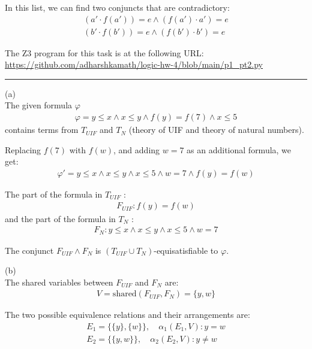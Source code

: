 \documentclass[12pt,letterpaper, onecolumn]{exam}
\newcommand{\link}[1]{{\color{blue}\href{#1}{#1}}}
\begin{document}
\begin{questions}
	In this list, we can find two conjuncts that are contradictory:
	\begin{align*}
		(a' \cdot f(a')) = e \land (f(a') \cdot a') = e \\
		(b' \cdot f(b')) = e \land (f(b') \cdot b') = e
	\end{align*}

	The Z3 program for this task is at the following URL:
	\link{https://github.com/adharshkamath/logic-hw-4/blob/main/p1\_pt2.py}


    {\rule{17cm}{0.4pt}}

	\question[]
	\solutiontitle

	(a) \\
	The given formula $ \varphi $
	\begin{align*}
		\varphi = y \le x \land x \le y \land f(y) = f(7) \land x \le 5
	\end{align*}
	contains terms from $ T_{UIF} $ and $ T_{N} $ (theory of UIF and theory of natural numbers).

	Replacing $ f(7) $ with $ f(w) $, and adding $ w= 7 $ as an additional formula, we get:
	\begin{align*}
		\varphi' = y \le x \land x \le y \land x \le 5 \land w = 7 \land f(y) = f(w) 
	\end{align*} 

	The part of the formula in $ T_{UIF} $ :
	\begin{align*}
		F_{UIF} : f(y) = f(w)
	\end{align*}
	and the part of the formula in $ T_{N} $ :
	\begin{align*}
		F_{N} : y \le x \land x \le y \land x \le 5 \land w = 7
	\end{align*}

	The conjunct $ F_{UIF} \land F_{N} $ is $(T_{UIF} \cup T_N)$-equisatisfiable to $ \varphi $.

	(b) \\
	The shared variables between $ F_{UIF} $ and $ F_{N} $ are:
	\begin{align*}
		V = \text{shared}(F_{UIF}, F_{N}) = \{y, w\}
	\end{align*}

	The two possible equivalence relations and their arrangements are:
	\begin{align*}
		E_1 = \{\{y\}, \{w\}\}, \quad \alpha_1(E_1, V) : y = w\\
		E_2 = \{\{y, w\}\}, \quad \alpha_2(E_2, V) : y \neq w
	\end{align*}


\end{questions}
\end{document}
